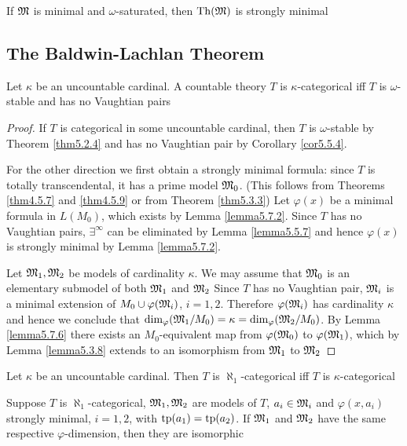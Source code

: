 \documentclass[11pt]{article}
\begin{document}
\begin{exercise}
\label{ex5.7.1}
If \(\mathfrak{M}\) is minimal and \(\omega\)-saturated, then \(\operatorname{Th}(\mathfrak{M})\) is strongly minimal
\end{exercise}


\subsection{The Baldwin-Lachlan Theorem}
\label{sec:orga47224a}
\begin{theorem}
Let \(\kappa\) be an uncountable cardinal. A countable theory \(T\) is \(\kappa\)-categorical iff \(T\) is
\(\omega\)-stable and has no Vaughtian pairs
\end{theorem}

\begin{proof}
If \(T\) is categorical in some uncountable cardinal, then \(T\) is \(\omega\)-stable by Theorem
\ref{thm5.2.4} and has no Vaughtian pair by Corollary \ref{cor5.5.4}.

For the other direction we first obtain a strongly minimal formula: since \(T\) is totally
transcendental, it has a prime model \(\mathfrak{M}_0\). (This follows from Theorems \ref{thm4.5.7} and
\ref{thm4.5.9} or from Theorem \ref{thm5.3.3}) Let \(\varphi(x)\) be a minimal formula in \(L(M_0)\),
which exists by Lemma \ref{lemma5.7.2}. Since \(T\) has no Vaughtian pairs, \(\exists^\infty\) can be
eliminated by Lemma \ref{lemma5.5.7} and hence \(\varphi(x)\) is strongly minimal by Lemma
\ref{lemma5.7.2}.

Let \(\mathfrak{M}_1,\mathfrak{M}_2\) be models of cardinality \(\kappa\). We may assume that \(\mathfrak{M}_0\) is an elementary submodel
of both \(\mathfrak{M}_1\) and \(\mathfrak{M}_2\)
Since \(T\) has no Vaughtian pair, \(\mathfrak{M}_i\) is a minimal extension of \(M_0\cup\varphi(\mathfrak{M}_i)\), \(i=1,2\).
Therefore \(\varphi(\mathfrak{M}_i)\) has cardinality \(\kappa\) and hence we conclude
that \(\dim_\varphi(\mathfrak{M}_1/M_0)=\kappa=\dim_\varphi(\mathfrak{M}_2/M_0)\). By Lemma \ref{lemma5.7.6} there exists
an \(M_0\)-equivalent map from \(\varphi(\mathfrak{M}_0)\) to \(\varphi(\mathfrak{M}_1)\), which by Lemma \ref{lemma5.3.8} extends to
an isomorphism from \(\mathfrak{M}_1\) to \(\mathfrak{M}_2\)
\end{proof}

\begin{corollary}[]
Let \(\kappa\) be an uncountable cardinal. Then \(T\) is \(\aleph_1\)-categorical iff \(T\) is \(\kappa\)-categorical
\end{corollary}

\begin{corollary}[]
Suppose \(T\) is \(\aleph_1\)-categorical, \(\mathfrak{M}_1,\mathfrak{M}_2\) are models of \(T\), \(a_i\in\mathfrak{M}_i\) and \(\varphi(x,a_i)\)
strongly minimal, \(i=1,2\), with \(\operatorname{tp}(a_1)=\operatorname{tp}(a_2)\). If \(\mathfrak{M}_1\) and \(\mathfrak{M}_2\) have the same
respective \(\varphi\)-dimension, then they are isomorphic
\end{corollary}
\end{document}
